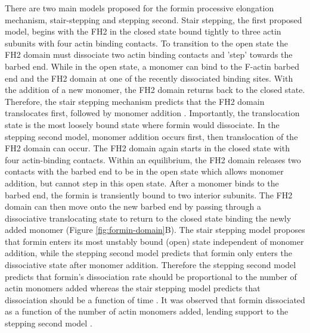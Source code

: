 There are two main models proposed for the formin processive elongation mechanism, stair-stepping and stepping second. Stair stepping, the first proposed model, begins with the FH2 in the closed state bound tightly to three actin subunits with four actin binding contacts. To transition to the open state the FH2 domain must dissociate two actin binding contacts and 'step' towards the barbed end. While in the open state, a monomer can bind to the F-actin barbed end and the FH2 domain at one of the recently dissociated binding sites. With the addition of a new monomer, the FH2 domain returns back to the closed state. Therefore, the stair stepping mechanism predicts that the FH2 domain translocates first, followed by monomer addition \citep{otomo_structural_2005}. Importantly, the translocation state is the most loosely bound state where formin would dissociate. In the stepping second model, monomer addition occurs first, then translocation of the FH2 domain can occur. The FH2 domain again starts in the closed state with four actin-binding contacts. Within an equilibrium, the FH2 domain releases two contacts with the barbed end to be in the open state which allows monomer addition, but cannot step in this open state. After a monomer binds to the barbed end, the formin is transiently bound to two interior subunits. The FH2 domain can then move onto the new barbed end by passing through a dissociative translocating state to return to the closed state binding the newly added monomer\citep{paul_role_2008,paul_review_2009} (Figure \ref{fig:formin-domain}B). The stair stepping model proposes that formin enters its most unstably bound (open) state independent of monomer addition, while the stepping second model predicts that formin only enters the dissociative state after monomer addition. Therefore the stepping second model predicts that formin's dissociation rate should be proportional to the number of actin monomers added whereas the stair stepping model predicts that dissociation should be a function of time \citep{paul_review_2009}. It was observed that formin dissociated as a function of the number of actin monomers added, lending support to the stepping second model \citep{paul_role_2008}. 

